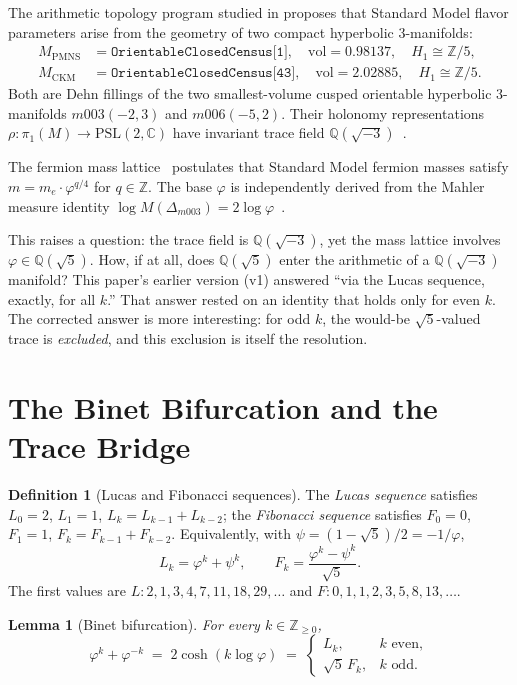 \documentclass[12pt]{article}
\newtheorem{lemma}[theorem]{Lemma}
\theoremstyle{definition}
\newtheorem{definition}[theorem]{Definition}
\newcommand{\Z}{\mathbb{Z}}
\newcommand{\Q}{\mathbb{Q}}
\newcommand{\C}{\mathbb{C}}
\newcommand{\ph}{\varphi}
\newcommand{\logph}{\log\ph}
\begin{document}
The arithmetic topology program studied in
\cite{gentry-ckm,gentry-pmns,gentry-cp,gentry-twist}
proposes that Standard Model flavor parameters arise from the geometry
of two compact hyperbolic 3-manifolds:
\begin{align*}
M_{\mathrm{PMNS}} &= \texttt{OrientableClosedCensus[1]},\quad
  \mathrm{vol} = 0.98137,\quad H_1 \cong \mathbb{Z}/5,\\
M_{\mathrm{CKM}}  &= \texttt{OrientableClosedCensus[43]},\quad
  \mathrm{vol} = 2.02885,\quad H_1 \cong \mathbb{Z}/5.
\end{align*}
Both are Dehn fillings of the two smallest-volume cusped orientable
hyperbolic 3-manifolds $m003(-2,3)$ and $m006(-5,2)$. Their
holonomy representations $\rho\colon \pi_1(M) \to \mathrm{PSL}(2,\C)$
have invariant trace field $\Q(\sqrt{-3})$~\cite{maclachlan-reid}.

The fermion mass lattice~\cite{gentry-core} postulates that Standard
Model fermion masses satisfy $m = m_e \cdot \ph^{q/4}$ for $q \in \Z$.
The base $\ph$ is independently derived from the Mahler measure identity
$\log M(\Delta_{m003}) = 2\logph$~\cite{gentry-jktr}.

This raises a question: the trace field is $\Q(\sqrt{-3})$, yet the
mass lattice involves $\ph \in \Q(\sqrt{5})$. How, if at all, does
$\Q(\sqrt{5})$ enter the arithmetic of a $\Q(\sqrt{-3})$ manifold?
This paper's earlier version (v1) answered ``via the Lucas sequence,
exactly, for all $k$.'' That answer rested on an identity that holds
only for even $k$. The corrected answer is more interesting: for odd
$k$, the would-be $\sqrt5$-valued trace is \emph{excluded}, and this
exclusion is itself the resolution.

\section{The Binet Bifurcation and the Trace Bridge}

\begin{definition}[Lucas and Fibonacci sequences]
The \emph{Lucas sequence} satisfies $L_0=2$, $L_1=1$,
$L_k=L_{k-1}+L_{k-2}$; the \emph{Fibonacci sequence} satisfies
$F_0=0$, $F_1=1$, $F_k=F_{k-1}+F_{k-2}$. Equivalently, with
$\psi=(1-\sqrt5)/2=-1/\ph$,
\[
  L_k=\ph^k+\psi^k, \qquad F_k=\frac{\ph^k-\psi^k}{\sqrt5}.
\]
The first values are $L: 2,1,3,4,7,11,18,29,\ldots$ and
$F: 0,1,1,2,3,5,8,13,\ldots$.
\end{definition}

\begin{lemma}[Binet bifurcation]
\label{lem:bifurcation}
For every $k\in\Z_{\geq0}$,
\[
  \ph^k+\ph^{-k} \;=\; 2\cosh(k\logph) \;=\;
  \begin{cases}
    L_k, & k \text{ even},\\[2pt]
    \sqrt5\,F_k, & k \text{ odd}.
  \end{cases}
\]
\end{lemma}
\end{document}
